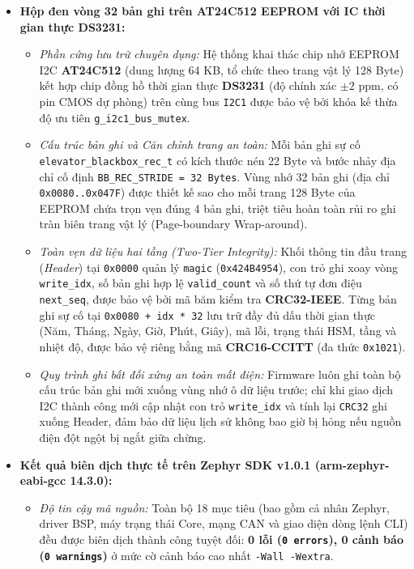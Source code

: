 \begin{itemize}[nosep]
\begin{itemize}[nosep]
    \end{itemize}
    \item \textbf{Hộp đen vòng 32 bản ghi trên AT24C512 EEPROM với IC thời gian thực DS3231:}
    \begin{itemize}[nosep]
        \item \textit{Phần cứng lưu trữ chuyên dụng:} Hệ thống khai thác chip nhớ EEPROM I2C \textbf{AT24C512} (dung lượng 64 KB, tổ chức theo trang vật lý 128 Byte) kết hợp chip đồng hồ thời gian thực \textbf{DS3231} (độ chính xác $\pm 2\text{ ppm}$, có pin CMOS dự phòng) trên cùng bus \texttt{I2C1} được bảo vệ bởi khóa kế thừa độ ưu tiên \texttt{g\_i2c1\_bus\_mutex}.
        \item \textit{Cấu trúc bản ghi và Căn chỉnh trang an toàn:} Mỗi bản ghi sự cố \texttt{elevator\_\allowbreak blackbox\_\allowbreak rec\_t} có kích thước nén 22 Byte và bước nhảy địa chỉ cố định \texttt{BB\_REC\_STRIDE = 32 Bytes}. Vùng nhớ 32 bản ghi (địa chỉ \texttt{0x0080..0x047F}) được thiết kế sao cho mỗi trang 128 Byte của EEPROM chứa trọn vẹn đúng 4 bản ghi, triệt tiêu hoàn toàn rủi ro ghi tràn biên trang vật lý (Page-boundary Wrap-around).
        \item \textit{Toàn vẹn dữ liệu hai tầng (\textit{Two-Tier Integrity}):} Khối thông tin đầu trang (\textit{Header}) tại \texttt{0x0000} quản lý \texttt{magic} (\texttt{0x424B4954}), con trỏ ghi xoay vòng \texttt{write\_idx}, số bản ghi hợp lệ \texttt{valid\_count} và số thứ tự đơn điệu \texttt{next\_seq}, được bảo vệ bởi mã băm kiểm tra \textbf{CRC32-IEEE}. Từng bản ghi sự cố tại \texttt{0x0080 + idx * 32} lưu trữ đầy đủ dấu thời gian thực (Năm, Tháng, Ngày, Giờ, Phút, Giây), mã lỗi, trạng thái HSM, tầng và nhiệt độ, được bảo vệ riêng bằng mã \textbf{CRC16-CCITT} (đa thức \texttt{0x1021}).
        \item \textit{Quy trình ghi bất đối xứng an toàn mất điện:} Firmware luôn ghi toàn bộ cấu trúc bản ghi mới xuống vùng nhớ ô dữ liệu trước; chỉ khi giao dịch I2C thành công mới cập nhật con trỏ \texttt{write\_idx} và tính lại \texttt{CRC32} ghi xuống Header, đảm bảo dữ liệu lịch sử không bao giờ bị hỏng nếu nguồn điện đột ngột bị ngắt giữa chừng.
    \end{itemize}
    \item \textbf{Kết quả biên dịch thực tế trên Zephyr SDK v1.0.1 (arm-zephyr-eabi-gcc 14.3.0):}
    \begin{itemize}[nosep]
        \item \textit{Độ tin cậy mã nguồn:} Toàn bộ 18 mục tiêu (bao gồm cả nhân Zephyr, driver BSP, máy trạng thái Core, mạng CAN và giao diện dòng lệnh CLI) đều được biên dịch thành công tuyệt đối: \textbf{0 lỗi (\texttt{0 errors}), 0 cảnh báo (\texttt{0 warnings})} ở mức cờ cảnh báo cao nhất \texttt{-Wall -Wextra}.

\end{itemize}
\end{itemize}
